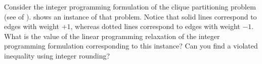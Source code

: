 \begin{exercise}
Consider the integer programming formulation of the clique partitioning problem (see  of ).  shows an instance of that problem. Notice that solid lines correspond to edges with weight $+1$, whereas dotted lines correspond to edges with weight $-1$. What is the value of the linear programming relaxation of the integer programming formulation corresponding to this instance? Can you find a violated inequality using integer rounding?
\end{exercise}